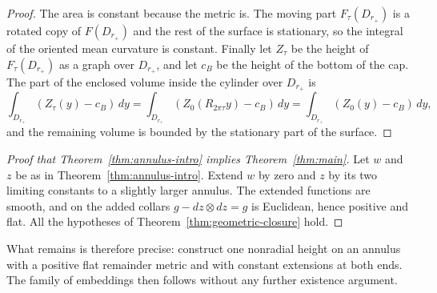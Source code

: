 \begin{proof}
The area is constant because the metric is. The moving part
$F_\tau(D_{r_+})$ is a rotated copy of $F(D_{r_+})$ and the rest of
the surface is stationary, so the integral of the oriented mean
curvature is constant. Finally let $Z_\tau$ be the height of
$F_\tau(D_{r_+})$ as a graph over $D_{r_+}$, and let $c_B$ be the
height of the bottom of the cap. The part of the enclosed volume
inside the cylinder over $D_{r_+}$ is
\[
 \int_{D_{r_+}}(Z_\tau(y)-c_B)\,dy
 =\int_{D_{r_+}}(Z_0(R_{2\pi\tau}y)-c_B)\,dy
 =\int_{D_{r_+}}(Z_0(y)-c_B)\,dy,
\]
and the remaining volume is bounded by the stationary part of the
surface.
\end{proof}

\begin{proof}[Proof that Theorem~\ref{thm:annulus-intro} implies
Theorem~\ref{thm:main}]
Let $w$ and $z$ be as in Theorem~\ref{thm:annulus-intro}. Extend $w$
by zero and $z$ by its two limiting constants to a slightly larger
annulus. The extended functions are smooth, and on the added collars
$g-dz\otimes dz=g$ is Euclidean, hence positive and flat. All the
hypotheses of Theorem~\ref{thm:geometric-closure} hold.
\end{proof}

What remains is therefore precise: construct one nonradial height on
an annulus with a positive flat remainder metric and with constant
extensions at both ends. The family of embeddings then follows without
any further existence argument.
